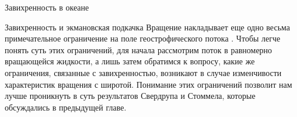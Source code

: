 \begin{chapter}{Завихренность в океане}
\begin{section}{Завихренность и экмановская подкачка}
%
Вращение накладывает еще одно весьма примечательное ограничение 
на поле геострофического потока%
. 
Чтобы легче понять суть этих ограничений, для начала рассмотрим поток в 
равномерно вращающейся жидкости, а лишь затем обратимся к вопросу, какие же
ограничения, связанные с завихренностью, возникают в случае изменчивости
характеристик вращения с широтой. Понимание этих ограничений позволит нам
лучше проникнуть в суть результатов Свердрупа и Стоммела, которые
обсуждались в предыдущей главе.
%


\end{section}
\end{chapter}
